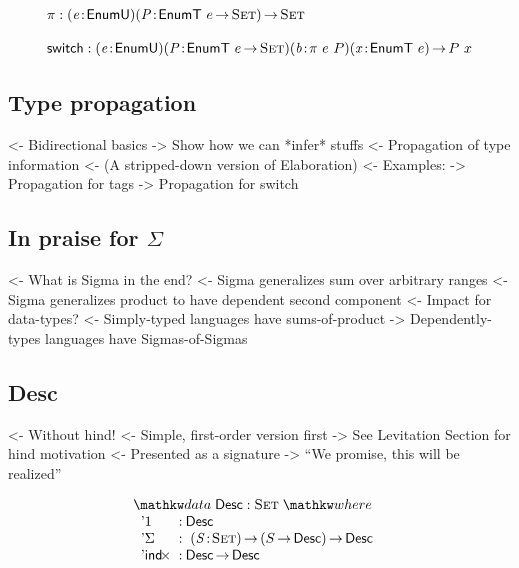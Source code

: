\documentclass[preprint, authoryear]{sigplanconf}
\newenvironment{structure}{\footnotesize\verbatim}{\endverbatim}
\begin{document}
\[\stk{
\F{$\pi$} : \PITEL{\V{e}}{\EnumU}
            \PITEL{\V{P}}{\EnumT{e} \To \Set} \To \Set \\
\\
\F{switch} : \PITEL{\V{e}}{\EnumU}
             \PITEL{\V{P}}{\EnumT{e} \To \Set}
             \PITEL{\V{b}}{\spi{e}{P}}
             \PITEL{\V{x}}{\EnumT{e}} \To P~x
}\]

\subsection{Type propagation}

\begin{structure}
<- Bidirectional basics
    -> Show how we can *infer* stuffs 
        <- Propagation of type information
    <- (A stripped-down version of Elaboration)
<- Examples:
    -> Propagation for tags
    -> Propagation for switch
\end{structure}

\subsection{In praise for $\Sigma$}

\begin{structure}
<- What is Sigma in the end?
    <- Sigma generalizes sum over arbitrary ranges
    <- Sigma generalizes product to have dependent second component
<- Impact for data-types?
    <- Simply-typed languages have sums-of-product
    -> Dependently-types languages have Sigmas-of-Sigmas
\end{structure}

\subsection{Desc}

\begin{structure}
<- Without hind!
    <- Simple, first-order version first
    -> See Levitation Section for hind motivation
<- Presented as a signature
    -> ``We promise, this will be realized''
\end{structure}

\[
\stk{
\data \Desc : \Set \where \\
\;\;\begin{array}{@{}l@{\::\:}l@{\quad}l}
    \DUnit          & \Desc \\
    \DSigma         & \PI{\V{S}}{\Set} \PIS{S \To \Desc} \Desc \\
    \DIndx          & \Desc \To \Desc
\end{array}
}
\]
\end{document}
